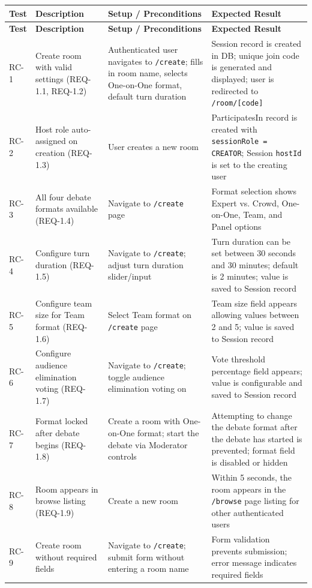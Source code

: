\documentclass[12pt]{article}
\begin{document}
\begin{longtable}{|p{1.5cm}|p{3cm}|p{4cm}|p{4cm}|}
\hline
\textbf{Test} & \textbf{Description} & \textbf{Setup / Preconditions} & \textbf{Expected Result} \\
\hline
\endfirsthead
\hline
\textbf{Test} & \textbf{Description} & \textbf{Setup / Preconditions} & \textbf{Expected Result} \\
\hline
\endhead
RC-1 & Create room with valid settings (REQ-1.1, REQ-1.2) & Authenticated user navigates to \texttt{/create}; fills in room name, selects One-on-One format, default turn duration & Session record is created in DB; unique join code is generated and displayed; user is redirected to \texttt{/room/[code]} \\
\hline
RC-2 & Host role auto-assigned on creation (REQ-1.3) & User creates a new room & ParticipatesIn record is created with \texttt{sessionRole = CREATOR}; Session \texttt{hostId} is set to the creating user \\
\hline
RC-3 & All four debate formats available (REQ-1.4) & Navigate to \texttt{/create} page & Format selection shows Expert vs. Crowd, One-on-One, Team, and Panel options \\
\hline
RC-4 & Configure turn duration (REQ-1.5) & Navigate to \texttt{/create}; adjust turn duration slider/input & Turn duration can be set between 30 seconds and 30 minutes; default is 2 minutes; value is saved to Session record \\
\hline
RC-5 & Configure team size for Team format (REQ-1.6) & Select Team format on \texttt{/create} page & Team size field appears allowing values between 2 and 5; value is saved to Session record \\
\hline
RC-6 & Configure audience elimination voting (REQ-1.7) & Navigate to \texttt{/create}; toggle audience elimination voting on & Vote threshold percentage field appears; value is configurable and saved to Session record \\
\hline
RC-7 & Format locked after debate begins (REQ-1.8) & Create a room with One-on-One format; start the debate via Moderator controls & Attempting to change the debate format after the debate has started is prevented; format field is disabled or hidden \\
\hline
RC-8 & Room appears in browse listing (REQ-1.9) & Create a new room & Within 5 seconds, the room appears in the \texttt{/browse} page listing for other authenticated users \\
\hline
RC-9 & Create room without required fields & Navigate to \texttt{/create}; submit form without entering a room name & Form validation prevents submission; error message indicates required fields \\
\hline
\end{longtable}
\end{document}
